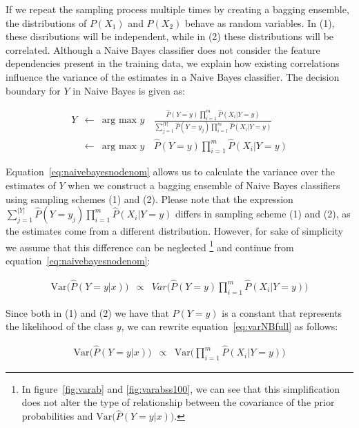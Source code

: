If we repeat the sampling process multiple times by creating a bagging ensemble, the distributions of $P(X_1)$ and $P(X_2)$ behave as random variables. In (1), these disributions will be independent, while in (2) these distributions will be correlated. Although a Naive Bayes classifier does not consider the feature dependencies present in the training data, we explain how existing correlations influence the variance of the estimates in a Naive Bayes classifier. The decision boundary for $Y$ in Naive Bayes is given as:

\begin{eqnarray}
Y &\longleftarrow& \mbox{arg max $y$ }\;\frac{\hat{P}(Y = y) \prod_{i=1}^m{\hat{P}(X_i|Y=y)}}{\sum_{j=1}^{|Y|}{\hat{P}(Y=y_j)} \prod_{i=1}^{m}{\hat{P}(X_i|Y=y)}} \label{eq:naivebayesdenom}\\
&\longleftarrow& \mbox{arg max $y$ }\;\hat{P}(Y = y) \prod_{i=1}^m{\hat{P}(X_i|Y=y)}\label{eq:naivebayesnodenom}
\end{eqnarray}

Equation~\ref{eq:naivebayesnodenom} allows us to calculate the variance over the estimates of $Y$ when we construct a bagging ensemble of Naive Bayes classifiers using sampling schemes (1) and (2). Please note that the expression $\sum_{j=1}^{|Y|}{\hat{P}(Y=y_j)} \prod_{i=1}^{m}{\hat{P}(X_i|Y=y)}$ differs in sampling scheme (1) and (2), as the estimates come from a different distribution.  However, for sake of simplicity we assume that this difference can be neglected \footnote{In figure~\ref{fig:varab} and \ref{fig:varabss100}, we can see that this simplification does not alter the type of relationship between the covariance of the prior probabilities and $\mbox{Var}\big(\hat{P}(Y=y|x)\big)$.} and continue from equation~\ref{eq:naivebayesnodenom}:

\begin{eqnarray}
\mbox{Var}\big(\hat{P}(Y=y|x)\big) &\propto& Var \big (\hat{P}(Y = y) \prod_{i=1}^m{\hat{P}(X_i|Y=y)} \big )\label{eq:varNBfull}
\end{eqnarray}

Since both in (1) and (2) we have that $P(Y = y)$ is a constant that represents the likelihood of the class $y$, we can rewrite equation~\ref{eq:varNBfull} as follows:

\begin{eqnarray}
\mbox{Var}\big(\hat{P}(Y=y|x)\big) &\propto& \mbox{Var} \big (\prod_{i=1}^m{\hat{P}(X_i|Y=y)} \big )
\end{eqnarray}

